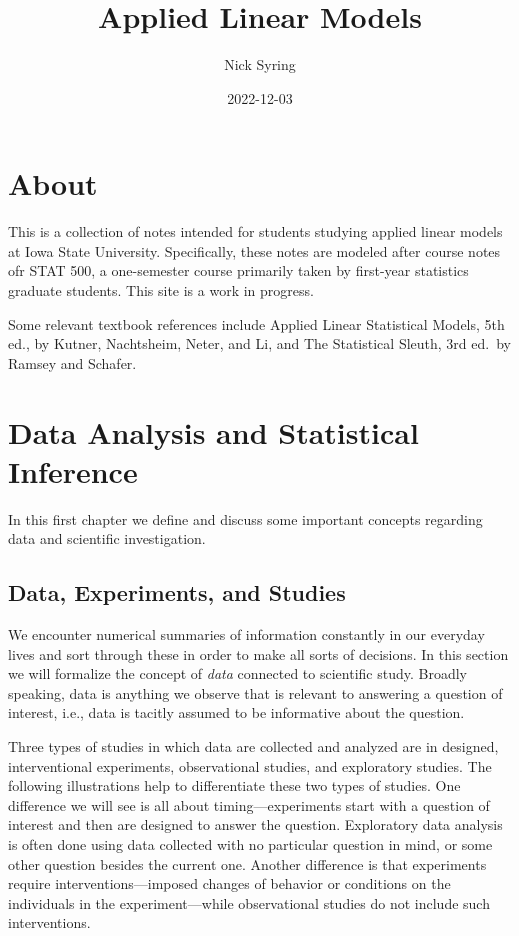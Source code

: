 \documentclass[
]{book}
\title{Applied Linear Models}
\author{Nick Syring}
\date{2022-12-03}
\begin{document}
\maketitle

{
\setcounter{tocdepth}{1}
\tableofcontents
}
\hypertarget{about}{%
\chapter{About}\label{about}}

This is a collection of notes intended for students studying applied linear models at Iowa State University. Specifically, these notes are modeled after course notes ofr STAT 500, a one-semester course primarily taken by first-year statistics graduate students. This site is a work in progress.

Some relevant textbook references include Applied Linear Statistical Models, 5th ed., by Kutner, Nachtsheim, Neter, and Li, and The Statistical Sleuth, 3rd ed.~by Ramsey and Schafer.

\hypertarget{data-analysis-and-statistical-inference}{%
\chapter{Data Analysis and Statistical Inference}\label{data-analysis-and-statistical-inference}}

In this first chapter we define and discuss some important concepts regarding data and scientific investigation.

\hypertarget{data-experiments-and-studies}{%
\section{Data, Experiments, and Studies}\label{data-experiments-and-studies}}

We encounter numerical summaries of information constantly in our everyday lives and sort through these in order to make all sorts of decisions. In this section we will formalize the concept of \emph{data} connected to scientific study. Broadly speaking, data is anything we observe that is relevant to answering a question of interest, i.e., data is tacitly assumed to be informative about the question.

Three types of studies in which data are collected and analyzed are in designed, interventional experiments, observational studies, and exploratory studies. The following illustrations help to differentiate these two types of studies. One difference we will see is all about timing---experiments start with a question of interest and then are designed to answer the question. Exploratory data analysis is often done using data collected with no particular question in mind, or some other question besides the current one. Another difference is that experiments require interventions---imposed changes of behavior or conditions on the individuals in the experiment---while observational studies do not include such interventions.
\end{document}
